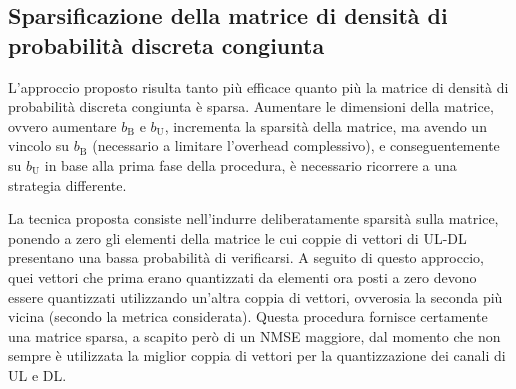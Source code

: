\subsection{Sparsificazione della matrice di densità di probabilità discreta
congiunta}
\label{subsec:p-matrix-sparsification}

L'approccio proposto risulta tanto più efficace quanto più la matrice di
densità di probabilità discreta congiunta è sparsa. Aumentare le dimensioni
della matrice, ovvero aumentare \(b_\mathrm{B}\) e \(b_\mathrm{U}\), incrementa
la sparsità della matrice, ma avendo un vincolo su \(b_\mathrm{B}\) (necessario
a limitare l'overhead complessivo), e conseguentemente su \(b_\mathrm{U}\) in
base alla prima fase della procedura, è necessario ricorrere a una strategia
differente.

La tecnica proposta consiste nell'indurre deliberatamente sparsità sulla
matrice, ponendo a zero gli elementi della matrice le cui coppie di vettori di
UL-DL presentano una bassa probabilità di verificarsi. A seguito di questo
approccio, quei vettori che prima erano quantizzati da elementi ora posti a
zero devono essere quantizzati utilizzando un'altra coppia di vettori,
ovverosia la seconda più vicina (secondo la metrica considerata). Questa
procedura fornisce certamente una matrice sparsa, a scapito però di un NMSE
maggiore, dal momento che non sempre è utilizzata la miglior coppia di vettori
per la quantizzazione dei canali di UL e DL.
